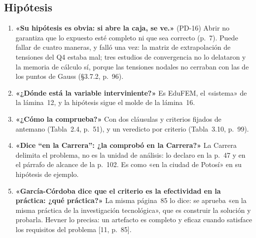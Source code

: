 \documentclass[11pt,a4paper]{article}
\begin{document}
\subsection{Hipótesis}
\begin{enumerate}[resume*=preg]
\item \textbf{«Su hipótesis es obvia: si abre la caja, se ve.»} (PD-16) Abrir no garantiza que lo expuesto esté completo ni que sea correcto (p.~7). Puede fallar de cuatro maneras, y falló una vez: la matriz de extrapolación de tensiones del Q4 estaba mal; tres estudios de convergencia no lo delataron y la memoria de cálculo sí, porque las tensiones nodales no cerraban con las de los puntos de Gauss (§3.7.2, p.~96).
\item \textbf{«¿Dónde está la variable interviniente?»} Es EduFEM, el «sistema» de la lámina~12, y la hipótesis sigue el molde de la lámina~16.
\item \textbf{«¿Cómo la comprueba?»} Con dos cláusulas y criterios fijados de antemano (Tabla~2.4, p.~51), y un veredicto por criterio (Tabla~3.10, p.~99).
\item \textbf{«Dice “en la Carrera”: ¿la comprobó en la Carrera?»} La Carrera delimita el problema, no es la unidad de análisis: lo declaro en la p.~47 y en el párrafo de alcance de la p.~102. Es como «en la ciudad de Potosí» en su hipótesis de ejemplo.
\item \textbf{«García-Córdoba dice que el criterio es la efectividad en la práctica: ¿qué práctica?»} La misma página~85 lo dice: se aprueba «en la misma práctica de la investigación tecnológica», que es construir la solución y probarla. Hevner lo precisa: un artefacto es completo y eficaz cuando satisface los requisitos del problema [11, p.~85].
\end{enumerate}
\end{document}

